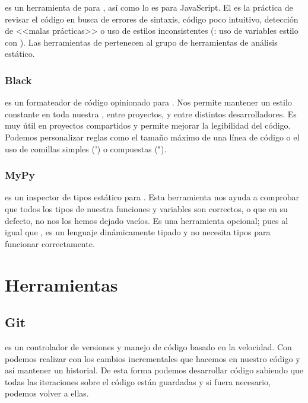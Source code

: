  es un herramienta de  para , así como  lo es para JavaScript. El  es la práctica de revisar el código en busca de errores de sintaxis, código poco intuitivo, detección de <<malas prácticas>> o uso de estilos inconsistentes (\pe: uso de variables estilo  con ). Las herramientas de  pertenecen al grupo de herramientas de análisis estático.

\subsubsection{Black}

 es un formateador de código opinionado para . Nos permite mantener un estilo constante en toda nuestra , entre proyectos, y entre distintos desarrolladores. Es muy útil en proyectos compartidos y permite mejorar la legibilidad del código. Podemos personalizar reglas como el tamaño máximo de una línea de código o el uso de comillas simples (') o compuestas (").

\subsubsection{MyPy}

 es un inspector de tipos estático para . Esta herramienta nos ayuda a comprobar que todos los tipos de nuestra funciones y variables son correctos, o que en su defecto, no nos los hemos dejado vacíos. Es una herramienta opcional; pues al igual que ,  es un lenguaje dinámicamente tipado y no necesita tipos para funcionar correctamente.


\section{Herramientas}

\subsection{Git}

 es un controlador de versiones y manejo de código basado en la velocidad. Con  podemos realizar  con los cambios incrementales que hacemos en nuestro código y así mantener un historial. De esta forma podemos desarrollar código sabiendo que todas las iteraciones sobre el código están guardadas y si fuera necesario, podemos volver a ellas.

